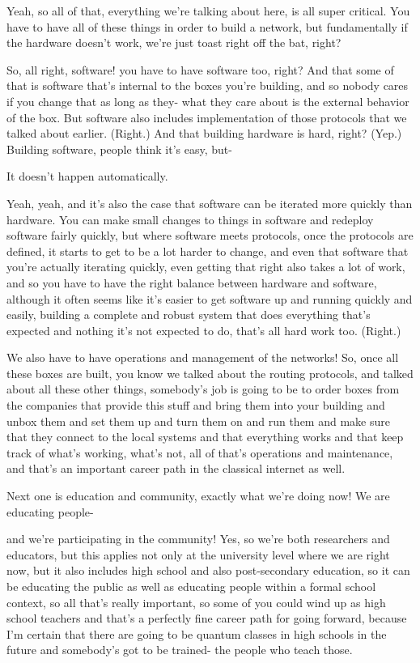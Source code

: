 Yeah, so all of that, everything we're talking about here, is all super critical. You have to have all of these things in order to build a network, but fundamentally if the hardware doesn't work, we're just toast right off the bat, right?

So, all right, software! you have to have software too, right? And that some of that is software that's internal to the boxes you're building, and so nobody cares if you change that as long as they- what they care about is the external behavior of the box. But software also includes implementation of those protocols that we talked about earlier. (Right.) And that building hardware is hard, right? (Yep.) Building software, people think it's easy, but-

It doesn't happen automatically.

Yeah, yeah, and it's also the case that software can be iterated more quickly than hardware. You can make small changes to things in software and redeploy software fairly quickly, but where software meets protocols, once the protocols are defined, it starts to get to be a lot harder to change, and even that software that you're actually iterating quickly, even getting that right also takes a lot of work, and so you have to have the right balance between hardware and software, although it often seems like it's easier to get software up and running quickly and easily, building a complete and robust system that does everything that's expected and nothing it's not expected to do, that's all hard work too. (Right.)

We also have to have operations and management of the networks! So, once all these boxes are built, you know we talked about the routing protocols, and talked about all these other things, somebody's job is going to be to order boxes from the companies that provide this stuff and bring them into your building and unbox them and set them up and turn them on and run them and make sure that they connect to the local systems and that everything works and that keep track of what's working, what's not, all of that's operations and maintenance, and that's an important career path in the classical internet as well.

Next one is education and community, exactly what we're doing now! We are educating people-

and we're participating in the community! Yes, so we're both researchers and educators, but this applies not only at the university level where we are right now, but it also includes high school and also post-secondary education, so it can be educating the public as well as educating people within a formal school context, so all that's really important, so some of you could wind up as high school teachers and that's a perfectly fine career path for going forward, because I'm certain that there are going to be quantum classes in high schools in the future and somebody's got to be trained- the people who teach those.

